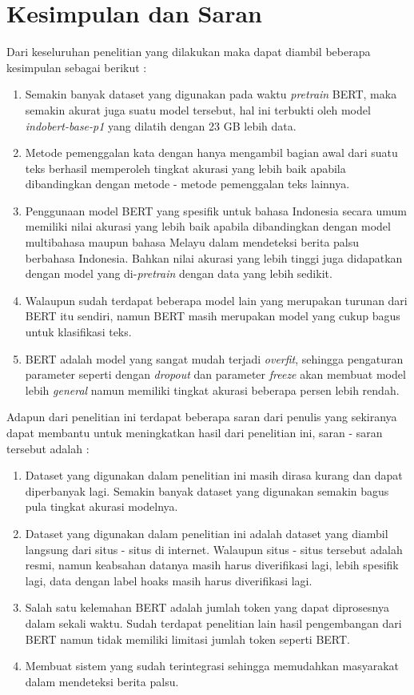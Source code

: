 \section{Kesimpulan dan Saran}
\label{sec:kesimpulandansaran}

Dari keseluruhan penelitian yang dilakukan maka dapat diambil beberapa kesimpulan sebagai berikut :

\begin{enumerate}
    \item Semakin banyak dataset yang digunakan pada waktu \textit{pretrain} BERT, maka semakin akurat juga suatu model tersebut, hal ini terbukti oleh model \textit{indobert-base-p1} yang dilatih dengan 23 GB lebih data.
    \item Metode pemenggalan kata dengan hanya mengambil bagian awal dari suatu teks berhasil memperoleh tingkat akurasi yang lebih baik apabila dibandingkan dengan metode - metode pemenggalan teks lainnya.
    \item Penggunaan model BERT yang spesifik untuk bahasa Indonesia secara umum memiliki nilai akurasi yang lebih baik apabila dibandingkan dengan model multibahasa maupun bahasa Melayu dalam mendeteksi berita palsu berbahasa Indonesia. Bahkan nilai akurasi yang lebih tinggi juga didapatkan dengan model yang di-\textit{pretrain} dengan data yang lebih sedikit.
    \item Walaupun sudah terdapat beberapa model lain yang merupakan turunan dari BERT itu sendiri, namun BERT masih merupakan model yang cukup bagus untuk klasifikasi teks.
    \item BERT adalah model yang sangat mudah terjadi \textit{overfit}, sehingga pengaturan parameter seperti dengan \textit{dropout} dan parameter \textit{freeze} akan membuat model lebih \textit{general} namun memiliki tingkat akurasi beberapa persen lebih rendah.
\end{enumerate}

Adapun dari penelitian ini terdapat beberapa saran dari penulis yang sekiranya dapat membantu untuk meningkatkan hasil dari penelitian ini, saran - saran tersebut adalah :

\begin{enumerate}
    \item Dataset yang digunakan dalam penelitian ini masih dirasa kurang dan dapat diperbanyak lagi. Semakin banyak dataset yang digunakan semakin bagus pula tingkat akurasi modelnya.
    \item Dataset yang digunakan dalam penelitian ini adalah dataset yang diambil langsung dari situs - situs di internet. Walaupun situs - situs tersebut adalah resmi, namun keabsahan datanya masih harus diverifikasi lagi, lebih spesifik lagi, data dengan label hoaks masih harus diverifikasi lagi.
    \item Salah satu kelemahan BERT adalah jumlah token yang dapat diprosesnya dalam sekali waktu. Sudah terdapat penelitian lain hasil pengembangan dari BERT namun tidak memiliki limitasi jumlah token seperti BERT.
    \item Membuat sistem yang sudah terintegrasi sehingga memudahkan masyarakat dalam mendeteksi berita palsu.
\end{enumerate}
